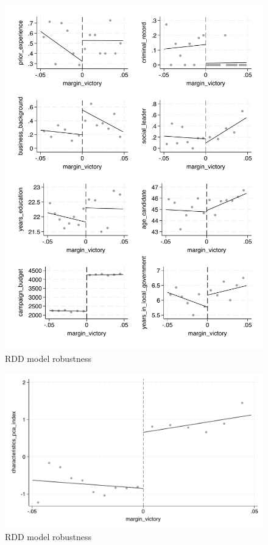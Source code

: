 \documentclass{article}
\begin{document}
\begin{figure}
    \centering
    \includegraphics[scale=0.5]{../outputs/characteristics_binned_scatter_esmv_linear_plot.pdf}
    \caption{RDD model robustness}
    \label{fig:characteristics}
\end{figure}

\begin{figure}[H]
    \centering
    \includegraphics[scale=0.5]{../outputs/characteristics_pca_index_binned_scatter_esmv_linear_plot.pdf}
    \caption{RDD model robustness}
    \label{fig:pca_index}
\end{figure}
\end{document}
